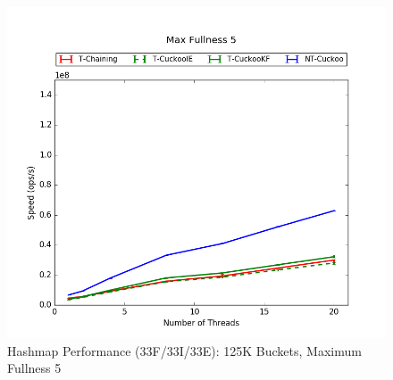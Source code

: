 \begin{figure}[H]
    \centering
	\begin{minipage}{0.5\textwidth}\includegraphics[width=\textwidth]{maps/5HM125K:F34,I33,E33.png} 
    \end{minipage}
	\begin{minipage}{0.4\textwidth}
    
    \end{minipage}
    \caption{Hashmap Performance (33F/33I/33E): 125K Buckets, Maximum Fullness 5}
\end{figure}

